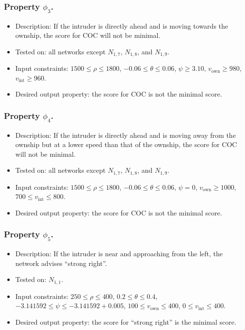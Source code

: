 \documentclass[a4paper]{llncs}
\begin{document}
\subsubsection{Property $\phi_3$.}
\begin{itemize}
\item Description:
  If the intruder is directly ahead and is moving towards the ownship,
  the score for COC will not be minimal.
\item Tested on: all networks except $N_{1,7}$, $N_{1,8}$, and $N_{1,9}$.
\item Input constraints:  
    $1500 \leq \rho \leq 1800$,
    $-0.06 \leq \theta \leq 0.06$,
    $\psi \geq 3.10$,
    $v_\text{own}\geq 980$,
    $v_\text{int}\geq 960$.
\item Desired output property: the score for COC is not the minimal score.
\end{itemize}

\subsubsection{Property $\phi_4$.}
\begin{itemize}
\item Description:
  If the intruder is directly ahead and is moving away from the
  ownship but at a lower speed than that of the ownship,
  the score for COC will not be minimal.
\item Tested on: all networks except $N_{1,7}$, $N_{1,8}$, and $N_{1,9}$.
\item Input constraints:  
    $1500 \leq \rho \leq 1800$,
    $-0.06 \leq \theta \leq 0.06$,
    $\psi = 0$,
    $v_\text{own}\geq 1000$,
    $700 \leq v_\text{int}\leq 800$.
\item Desired output property: the score for COC is not the minimal score.
\end{itemize}

\subsubsection{Property $\phi_5$.}
\begin{itemize}
\item Description:
  If the intruder is near and approaching from the
  left, the network advises ``strong right''.
\item Tested on: $N_{1,1}$.
\item Input constraints:
    $250 \leq \rho \leq 400$,
    $0.2 \leq \theta \leq 0.4$,
    $-3.141592 \leq \psi \leq -3.141592 + 0.005$,
    $100 \leq v_\text{own}\leq 400$,
    $0 \leq v_\text{int}\leq 400$.
\item Desired output property: the score for ``strong right'' is the minimal score.
\end{itemize}
\end{document}
